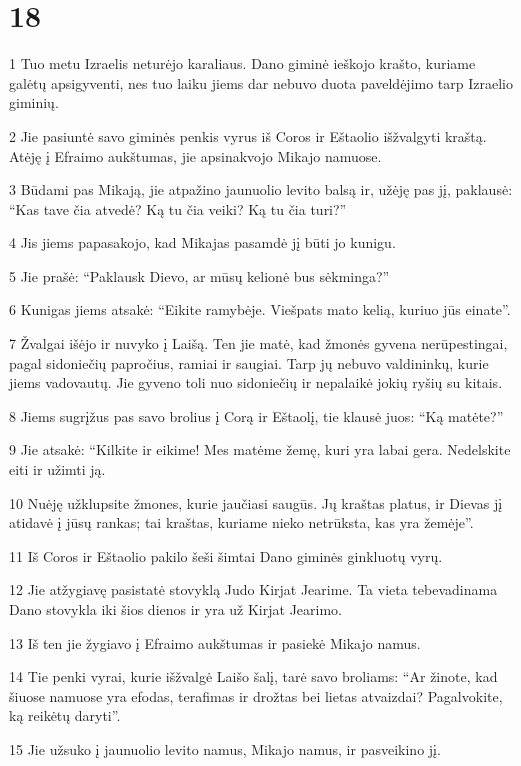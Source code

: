 \chapter{18}

\par 1 Tuo metu Izraelis neturėjo karaliaus. Dano giminė ieškojo krašto, kuriame galėtų apsigyventi, nes tuo laiku jiems dar nebuvo duota paveldėjimo tarp Izraelio giminių. 
\par 2 Jie pasiuntė savo giminės penkis vyrus iš Coros ir Eštaolio išžvalgyti kraštą. Atėję į Efraimo aukštumas, jie apsinakvojo Mikajo namuose. 
\par 3 Būdami pas Mikają, jie atpažino jaunuolio levito balsą ir, užėję pas jį, paklausė: “Kas tave čia atvedė? Ką tu čia veiki? Ką tu čia turi?” 
\par 4 Jis jiems papasakojo, kad Mikajas pasamdė jį būti jo kunigu. 
\par 5 Jie prašė: “Paklausk Dievo, ar mūsų kelionė bus sėkminga?” 
\par 6 Kunigas jiems atsakė: “Eikite ramybėje. Viešpats mato kelią, kuriuo jūs einate”. 
\par 7 Žvalgai išėjo ir nuvyko į Laišą. Ten jie matė, kad žmonės gyvena nerūpestingai, pagal sidoniečių papročius, ramiai ir saugiai. Tarp jų nebuvo valdininkų, kurie jiems vadovautų. Jie gyveno toli nuo sidoniečių ir nepalaikė jokių ryšių su kitais. 
\par 8 Jiems sugrįžus pas savo brolius į Corą ir Eštaolį, tie klausė juos: “Ką matėte?” 
\par 9 Jie atsakė: “Kilkite ir eikime! Mes matėme žemę, kuri yra labai gera. Nedelskite eiti ir užimti ją. 
\par 10 Nuėję užklupsite žmones, kurie jaučiasi saugūs. Jų kraštas platus, ir Dievas jį atidavė į jūsų rankas; tai kraštas, kuriame nieko netrūksta, kas yra žemėje”. 
\par 11 Iš Coros ir Eštaolio pakilo šeši šimtai Dano giminės ginkluotų vyrų. 
\par 12 Jie atžygiavę pasistatė stovyklą Judo Kirjat Jearime. Ta vieta tebevadinama Dano stovykla iki šios dienos ir yra už Kirjat Jearimo. 
\par 13 Iš ten jie žygiavo į Efraimo aukštumas ir pasiekė Mikajo namus. 
\par 14 Tie penki vyrai, kurie išžvalgė Laišo šalį, tarė savo broliams: “Ar žinote, kad šiuose namuose yra efodas, terafimas ir drožtas bei lietas atvaizdai? Pagalvokite, ką reikėtų daryti”. 
\par 15 Jie užsuko į jaunuolio levito namus, Mikajo namus, ir pasveikino jį. 
